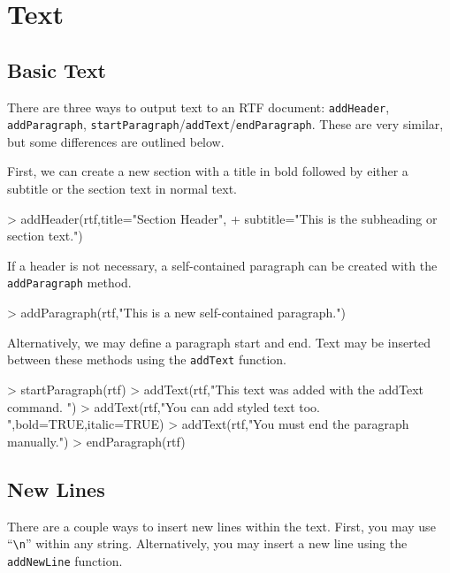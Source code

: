 \documentclass[11pt,letterpaper]{article}
\begin{document}
\section{Text}

\subsection{Basic Text}
There are three ways to output text to an RTF document: \texttt{addHeader}, \texttt{addParagraph}, \texttt{startParagraph}/\texttt{addText}/\texttt{endParagraph}.  These are very similar, but some differences are outlined below.

First, we can create a new section with a title in bold followed by either a subtitle or the section text in normal text.
\begin{Schunk}
\begin{Sinput}
> addHeader(rtf,title="Section Header",
+ 	      subtitle="This is the subheading or section text.")
\end{Sinput}
\end{Schunk}


If a header is not necessary, a self-contained paragraph can be created with the \texttt{addParagraph} method.
\begin{Schunk}
\begin{Sinput}
> addParagraph(rtf,"This is a new self-contained paragraph.\n")
\end{Sinput}
\end{Schunk}


Alternatively, we may define a paragraph start and end.  Text may be inserted between these methods using the \texttt{addText} function.

\begin{Schunk}
\begin{Sinput}
> startParagraph(rtf)
> addText(rtf,"This text was added with the addText command.  ")
> addText(rtf,"You can add styled text too.  ",bold=TRUE,italic=TRUE)
> addText(rtf,"You must end the paragraph manually.")
> endParagraph(rtf)
\end{Sinput}
\end{Schunk}


\subsection{New Lines}
There are a couple ways to insert new lines within the text.  First, you may use ``\texttt{\textbackslash n}'' within any string.  Alternatively, you may insert a new line using the \texttt{addNewLine} function.
\end{document}
